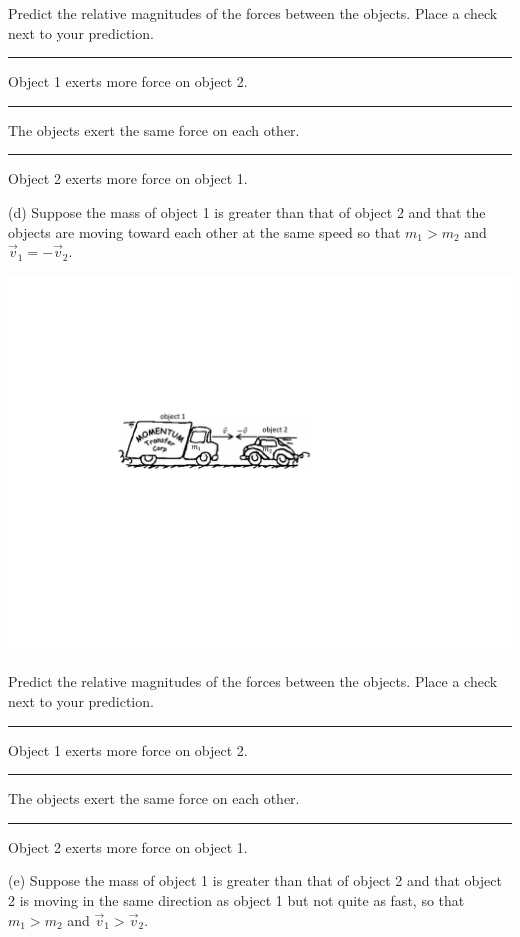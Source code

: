 \leftskip=1cm

Predict the relative magnitudes of the forces between the objects.
Place a check next to your prediction. 

\rule{0.5in}{0.1pt} Object 1 exerts more force on object 2. 

\rule{0.5in}{0.1pt} The objects exert the same force on each other. 

\rule{0.5in}{0.1pt} Object 2 exerts more force on object 1.

\leftskip=0cm

\bigskip
(d) Suppose the mass of object 1 is greater than that of object 2 and that the
objects are moving toward each other at the same speed so that
$m_{1}>m_{2}$ and
${\vec  v}_{1}=-{{\vec  v}_{2}}$.

{\par\centering \includegraphics{newtons_laws/newtons_laws_fig4_new.pdf} \par}

\leftskip=1cm

Predict the relative magnitudes of the forces between the objects.
Place a check next to your prediction. 

\rule{0.5in}{0.1pt} Object 1 exerts more force on object 2. 

\rule{0.5in}{0.1pt} The objects exert the same force on each other.

\rule{0.5in}{0.1pt} Object 2 exerts more force on object 1.

\leftskip=0cm

\bigskip

\pagebreak[3]
(e) Suppose the mass of object 1 is greater than that of object 2 and that object
2 is moving in the same direction as object 1 but not quite as fast, so that
$m_{1}>m_{2}$ and
${\vec  v}_1>{\vec  v}_2$.

